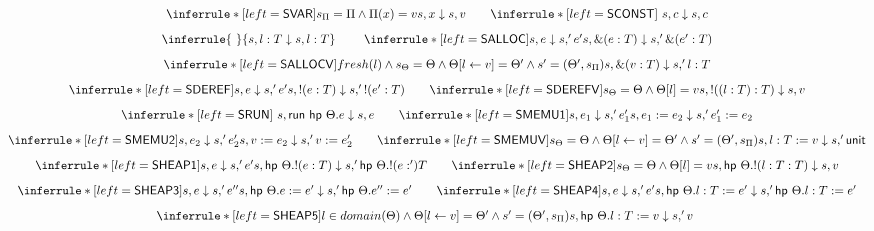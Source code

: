 \begin{figure}[H]
 \small
  \[
\begin{array}{@{}c@{}}
   \inferrule*[left=\kw{SVAR}]{s_\kvm = \kvm \wedge \kvm(x) = v}{\eval s x s v} \ \ \ \ \ \
      \inferrule*[left=\kw{SCONST}]{~}{\eval s c s c}\\[2ex]
      \inferrule{~}{\eval s {\addr l T} s {\addr l T}}\ \ \ \ \ \ \
      
       \inferrule*[left=\kw{SALLOC}]{\eval s e s' e'}{\eval s {\alloc e T} s' {\alloc {e'} T}}\\[2ex]
       \inferrule*[left=\kw{SALLOCV}]{fresh(l) \wedge s_\Theta = \Theta \wedge \kheap[l \leftarrow v] = \kheap' \wedge s' = (\kheap', s_\kvm)}{\eval s {\alloc v T}s' {\addr l T}}\\[2ex]
       
       \inferrule*[left=\kw{SDEREF}]{\eval s e s' e'}{\eval s {\deref e T} s' {\deref {e'} T}}\ \ \ \ \ \
       \inferrule*[left=\kw{SDEREFV}]{s_\Theta = \Theta  \wedge \kheap[l] = v}{\eval s {\deref {(\addr l T)} T} s v}\\[2ex]
       \inferrule*[left=\kw{SRUN}]{~}{\eval s {\run {\hpe \kheap e}} s e} \ \ \ \ \ \
       
       \inferrule*[left=\kw{SMEMU1}]{\eval s {e_1} s' {e_1'}}{\eval s {\eass {e_1} {e_2}} s' {\eass {e_1'} {e_2}}} \\[2ex]
       \inferrule*[left=\kw{SMEMU2}]{\eval s {e_2} s' {e_2'}}{\eval s {\eass {v} {e_2}} s' {\eass {v} {e_2'}}}\ \ \ \ \ \
       \inferrule*[left=\kw{SMEMUV}]{s_\Theta = \Theta \wedge \Theta[l \leftarrow v] = \Theta' \wedge s' = (\Theta', s_\Pi)}
       {\eval s {\eass {\addr l T} {v}} s' {\kunit}}\\[2ex]
       \inferrule*[left=\kw{SHEAP1}]{\eval s {e} s' {e'}}{\eval s {\hpe \kheap {\deref e T}} s' {\hpe \kheap {\deref e' T}}}\ \ \ \ \ \
       \inferrule*[left=\kw{SHEAP2}]{s_\Theta = \Theta  \wedge \kheap[l] = v}{\eval s {\hpe \kheap {\deref {\addr l T} T}} s v} \\[2ex]

       \inferrule*[left=\kw{SHEAP3}]{\eval s {e} s' {e''}}{\eval s {\hpe \kheap {\eass e e'}} s' {\hpe \kheap {\eass {e''} e'}}}\ \ \ \ \ \
       \inferrule*[left=\kw{SHEAP4}]{\eval s {e} s' {e'}}{\eval s {\hpe \kheap {\eass {\addr l T} e'}} s' {\hpe \kheap {\eass {\addr l T} e'}}}\\[2ex]
       
       \inferrule*[left=\kw{SHEAP5}]{l \in domain(\kheap) \wedge \kheap[l \leftarrow v] = \Theta' \wedge s' = (\Theta', s_\Pi)}{\eval s {\hpe \kheap {\eass {\addr l T} v}} s' v}\ \ \ \ \ \
       

\end{array}\]
\end{figure}
